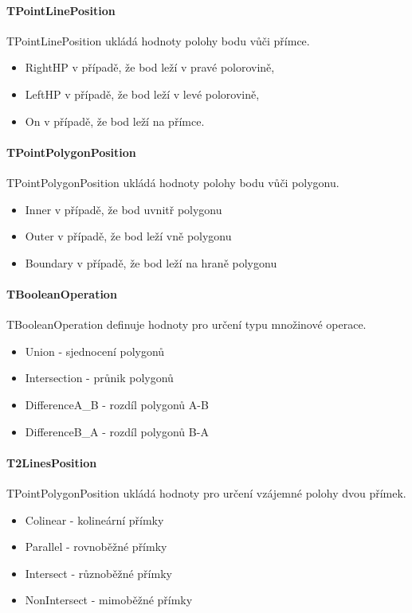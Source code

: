 \documentclass[11pt]{article}
\begin{document}
\paragraph{TPointLinePosition}
TPointLinePosition ukládá hodnoty polohy bodu vůči přímce.

\begin{itemize}
\item RightHP v případě, že bod leží v pravé polorovině,
\item LeftHP v případě, že  bod leží v levé polorovině,
\item On v případě, že bod leží na přímce.
\end{itemize}

\paragraph{TPointPolygonPosition}
TPointPolygonPosition ukládá hodnoty polohy bodu vůči polygonu.

\begin{itemize}
\item Inner v případě, že bod uvnitř polygonu
\item Outer v případě, že  bod leží vně polygonu
\item Boundary v případě, že bod leží na hraně polygonu
\end{itemize}

\paragraph{TBooleanOperation}
TBooleanOperation definuje hodnoty pro určení typu množinové operace.

\begin{itemize}
\item Union - sjednocení polygonů
\item Intersection - průnik polygonů
\item DifferenceA\_B - rozdíl polygonů A-B
\item DifferenceB\_A - rozdíl polygonů B-A
\end{itemize}

\paragraph{T2LinesPosition}
TPointPolygonPosition ukládá hodnoty pro určení vzájemné polohy dvou přímek.

\begin{itemize}
\item Colinear - kolineární přímky
\item Parallel - rovnoběžné přímky
\item Intersect - různoběžné přímky
\item NonIntersect - mimoběžné přímky
\end{itemize}
\end{document}
